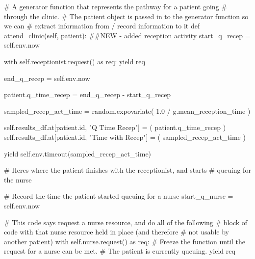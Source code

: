 \documentclass[
  letterpaper,
  DIV=11,
  numbers=noendperiod]{scrreprt}
\newenvironment{Shaded}{}{}
\newcommand{\BuiltInTok}[1]{\textcolor[rgb]{0.84,0.23,0.29}{#1}}
\newcommand{\CommentTok}[1]{\textcolor[rgb]{0.42,0.45,0.49}{#1}}
\newcommand{\ControlFlowTok}[1]{\textcolor[rgb]{0.84,0.23,0.29}{#1}}
\newcommand{\FloatTok}[1]{\textcolor[rgb]{0.00,0.36,0.77}{#1}}
\newcommand{\ImportTok}[1]{\textcolor[rgb]{0.01,0.18,0.38}{#1}}
\newcommand{\KeywordTok}[1]{\textcolor[rgb]{0.84,0.23,0.29}{#1}}
\newcommand{\NormalTok}[1]{\textcolor[rgb]{0.14,0.16,0.18}{#1}}
\newcommand{\OperatorTok}[1]{\textcolor[rgb]{0.14,0.16,0.18}{#1}}
\newcommand{\StringTok}[1]{\textcolor[rgb]{0.01,0.18,0.38}{#1}}
\newcommand{\VariableTok}[1]{\textcolor[rgb]{0.89,0.38,0.04}{#1}}
\begin{document}
\begin{Shaded}
\begin{Highlighting}[]
 \CommentTok{\# A generator function that represents the pathway for a patient going}
    \CommentTok{\# through the clinic.}
    \CommentTok{\# The patient object is passed in to the generator function so we can}
    \CommentTok{\# extract information from / record information to it}
    \KeywordTok{def}\NormalTok{ attend\_clinic(}\VariableTok{self}\NormalTok{, patient):}
        \CommentTok{\#\#NEW {-} added reception activity}
\NormalTok{        start\_q\_recep }\OperatorTok{=} \VariableTok{self}\NormalTok{.env.now}

        \ControlFlowTok{with} \VariableTok{self}\NormalTok{.receptionist.request() }\ImportTok{as}\NormalTok{ req:}
            \ControlFlowTok{yield}\NormalTok{ req}

\NormalTok{            end\_q\_recep }\OperatorTok{=} \VariableTok{self}\NormalTok{.env.now}

\NormalTok{            patient.q\_time\_recep }\OperatorTok{=}\NormalTok{ end\_q\_recep }\OperatorTok{{-}}\NormalTok{ start\_q\_recep}

\NormalTok{            sampled\_recep\_act\_time }\OperatorTok{=}\NormalTok{ random.expovariate(}
                \FloatTok{1.0} \OperatorTok{/}\NormalTok{ g.mean\_reception\_time}
\NormalTok{            )}

            \VariableTok{self}\NormalTok{.results\_df.at[patient.}\BuiltInTok{id}\NormalTok{, }\StringTok{"Q Time Recep"}\NormalTok{] }\OperatorTok{=}\NormalTok{ (}
\NormalTok{                 patient.q\_time\_recep}
\NormalTok{            )}
            \VariableTok{self}\NormalTok{.results\_df.at[patient.}\BuiltInTok{id}\NormalTok{, }\StringTok{"Time with Recep"}\NormalTok{] }\OperatorTok{=}\NormalTok{ (}
\NormalTok{                 sampled\_recep\_act\_time}
\NormalTok{            )}

            \ControlFlowTok{yield} \VariableTok{self}\NormalTok{.env.timeout(sampled\_recep\_act\_time)}

        \CommentTok{\# Here\textquotesingle{}s where the patient finishes with the receptionist, and starts}
        \CommentTok{\# queuing for the nurse}

        \CommentTok{\# Record the time the patient started queuing for a nurse}
\NormalTok{        start\_q\_nurse }\OperatorTok{=} \VariableTok{self}\NormalTok{.env.now}

        \CommentTok{\# This code says request a nurse resource, and do all of the following}
        \CommentTok{\# block of code with that nurse resource held in place (and therefore}
        \CommentTok{\# not usable by another patient)}
        \ControlFlowTok{with} \VariableTok{self}\NormalTok{.nurse.request() }\ImportTok{as}\NormalTok{ req:}
            \CommentTok{\# Freeze the function until the request for a nurse can be met.}
            \CommentTok{\# The patient is currently queuing.}
            \ControlFlowTok{yield}\NormalTok{ req}


\end{Highlighting}
\end{Shaded}
\end{document}
